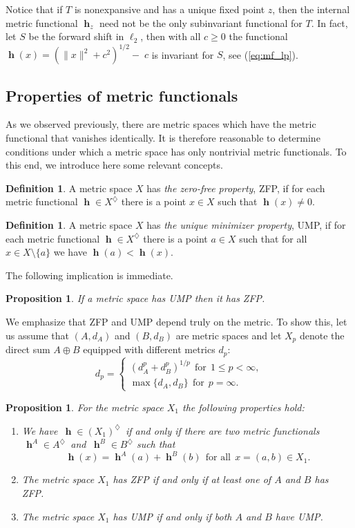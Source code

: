 \documentclass[a4paper,12pt]{article}
\newtheorem{proposition}[theorem]{Proposition}
\theoremstyle{definition}
\newtheorem{definition}[theorem]{Definition}
\numberwithin{equation}{section}
\newcommand{\norm}[1]{\lVert#1\rVert} %
\numberwithin{equation}{section}
\DeclareMathOperator{\h}{\mathbf{h}} %
\begin{document}
Notice that if $T$ is nonexpansive and has a unique 
fixed point $z$, then the internal metric functional 
$\h_z$ need not be the only subinvariant functional 
for $T$. In fact, let $S$ be the forward shift in 
$\ell_2$, then with all $c\geq 0$ the functional 
$\h(x)= ( \norm{x}^2 + c^2)^{1/2} -\;c$ is invariant 
for $S$, see (\ref{eq:mf_lp}).

\subsection{Properties of metric functionals}

As we observed previously, there are 
metric spaces which have the metric functional 
that vanishes identically. It is therefore 
reasonable to determine conditions under which
a metric space has only nontrivial metric
functionals. To this end, we introduce
here some relevant concepts.
 
\begin{definition} 
A metric space $X$ has 
\emph{the zero-free property}, ZFP, if for 
each metric functional 
$\h \in X^\diamondsuit$ there is 
a point $x \in X$ such that $\h(x)\neq 0$.
\end{definition}

\begin{definition}
A metric space $X$ has  
\emph{the unique minimizer property}, UMP, 
if for each metric functional 
$\h \in X^\diamondsuit$ there is a point 
$a \in X$ such that for all 
$x\in X\setminus\{a\}$ we have 
$\h(a) < \h(x)$.
\end{definition}

The following implication is immediate.

\begin{proposition}    
If a metric space has UMP then it has 
ZFP.
\end{proposition}
  
We emphasize that ZFP and UMP depend truly on 
the metric. To show this, let us assume that 
$(A,d_A)$ and $(B,d_B)$ are metric spaces and 
let $X_p$ denote the direct sum $A\oplus B$   
equipped with different metrics $d_p$:
$$
d_p = \begin{cases}
        (d_A^p + d_B^p)^{1/p} \ \ 
        \text{for}\ \ 1\leq p < \infty, \\
        \max\{ d_A, d_B\}\ \ 
        \text{for}\ \ p = \infty.
    \end{cases}
$$

\begin{proposition}  
For the metric space $X_1$ the following 
properties hold:
\begin{enumerate}
\item We have 
$\,\h \in (X_1)^\diamondsuit\,$ if and only 
if there are two metric functionals 
$\,\h^A\in A^\diamondsuit\,$ and 
$\,\h^B\in B^\diamondsuit$ such that
$$
\h(x) = \h^A(a) + \h^B(b)\ \ 
\text{for all}\ \ x=(a,b)\in X_1. 
$$
\item The metric space $X_1$ has ZFP if and 
only if at least one of $A$ and $B$ has ZFP.
\item The metric space $X_1$ has UMP if and 
only if both $A$ and $B$ have UMP.
\end{enumerate}
\end{proposition}
\end{document}
